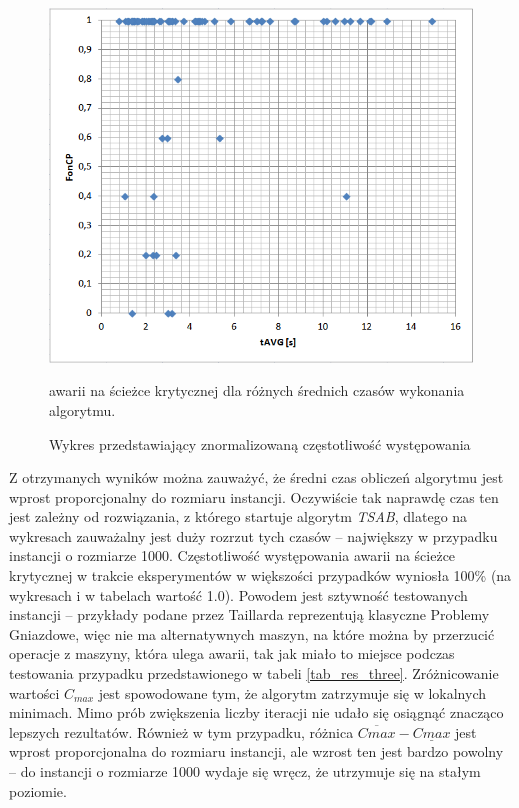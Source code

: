 \documentclass[printmode,oneside]{mgr}
\begin{document}
%
\begin{figure}[t!]
\begin{center}
\includegraphics[scale=0.68]{rysunki/wykres_czas_FonCP.png}
\caption{Wykres przedstawiający znormalizowaną częstotliwość występowania}{awarii na ścieżce krytycznej dla różnych średnich czasów wykonania algorytmu.}
\label{rys_wykres_czas_FonCP}
\end{center}
\end{figure}
%
Z otrzymanych wyników można zauważyć, że średni czas obliczeń algorytmu jest wprost proporcjonalny do rozmiaru instancji. Oczywiście tak naprawdę czas ten jest zależny od rozwiązania, z którego startuje algorytm \emph{TSAB}, dlatego na wykresach zauważalny jest duży rozrzut tych czasów -- największy w przypadku instancji o rozmiarze 1000. Częstotliwość występowania awarii na ścieżce krytycznej w trakcie eksperymentów w większości przypadków wyniosła 100\% (na wykresach i w tabelach wartość 1.0). Powodem jest sztywność testowanych instancji -- przykłady podane przez Taillarda reprezentują klasyczne Problemy Gniazdowe, więc nie ma alternatywnych maszyn, na które można by przerzucić operacje z maszyny, która ulega awarii, tak jak miało to miejsce podczas testowania przypadku przedstawionego w tabeli \ref{tab_res_three}. Zróżnicowanie wartości $C_{max}$ jest spowodowane tym, że algorytm zatrzymuje się w lokalnych minimach. Mimo prób zwiększenia liczby iteracji nie udało się osiągnąć znacząco lepszych rezultatów. Również w tym przypadku, różnica $\overline{C{max}} - \underline{C{max}}$ jest wprost proporcjonalna do rozmiaru instancji, ale wzrost ten jest bardzo powolny -- do instancji o rozmiarze 1000 wydaje się wręcz, że utrzymuje się na stałym poziomie.
\end{document}
